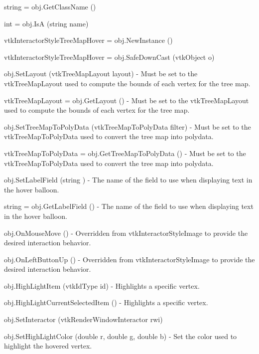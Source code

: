 \begin{DoxyItemize}
\item {\ttfamily string = obj.\-Get\-Class\-Name ()}  
\item {\ttfamily int = obj.\-Is\-A (string name)}  
\item {\ttfamily vtk\-Interactor\-Style\-Tree\-Map\-Hover = obj.\-New\-Instance ()}  
\item {\ttfamily vtk\-Interactor\-Style\-Tree\-Map\-Hover = obj.\-Safe\-Down\-Cast (vtk\-Object o)}  
\item {\ttfamily obj.\-Set\-Layout (vtk\-Tree\-Map\-Layout layout)} -\/ Must be set to the vtk\-Tree\-Map\-Layout used to compute the bounds of each vertex for the tree map.  
\item {\ttfamily vtk\-Tree\-Map\-Layout = obj.\-Get\-Layout ()} -\/ Must be set to the vtk\-Tree\-Map\-Layout used to compute the bounds of each vertex for the tree map.  
\item {\ttfamily obj.\-Set\-Tree\-Map\-To\-Poly\-Data (vtk\-Tree\-Map\-To\-Poly\-Data filter)} -\/ Must be set to the vtk\-Tree\-Map\-To\-Poly\-Data used to convert the tree map into polydata.  
\item {\ttfamily vtk\-Tree\-Map\-To\-Poly\-Data = obj.\-Get\-Tree\-Map\-To\-Poly\-Data ()} -\/ Must be set to the vtk\-Tree\-Map\-To\-Poly\-Data used to convert the tree map into polydata.  
\item {\ttfamily obj.\-Set\-Label\-Field (string )} -\/ The name of the field to use when displaying text in the hover balloon.  
\item {\ttfamily string = obj.\-Get\-Label\-Field ()} -\/ The name of the field to use when displaying text in the hover balloon.  
\item {\ttfamily obj.\-On\-Mouse\-Move ()} -\/ Overridden from vtk\-Interactor\-Style\-Image to provide the desired interaction behavior.  
\item {\ttfamily obj.\-On\-Left\-Button\-Up ()} -\/ Overridden from vtk\-Interactor\-Style\-Image to provide the desired interaction behavior.  
\item {\ttfamily obj.\-High\-Light\-Item (vtk\-Id\-Type id)} -\/ Highlights a specific vertex.  
\item {\ttfamily obj.\-High\-Light\-Current\-Selected\-Item ()} -\/ Highlights a specific vertex.  
\item {\ttfamily obj.\-Set\-Interactor (vtk\-Render\-Window\-Interactor rwi)}  
\item {\ttfamily obj.\-Set\-High\-Light\-Color (double r, double g, double b)} -\/ Set the color used to highlight the hovered vertex.  

\end{DoxyItemize}
